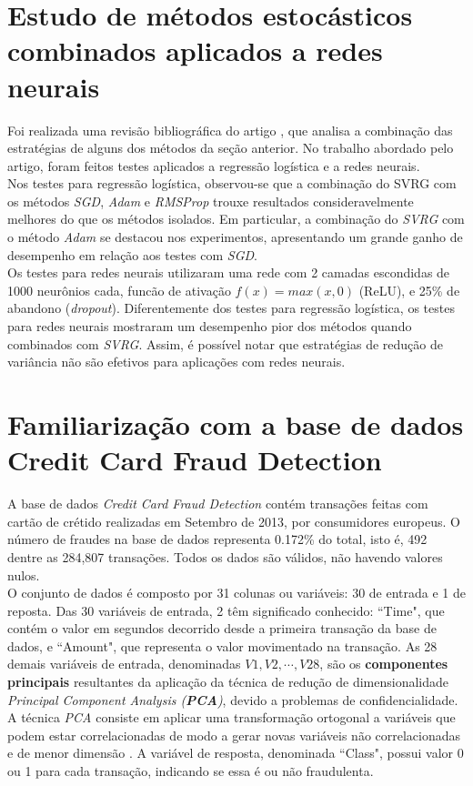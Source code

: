 \documentclass[a4paper,12pt]{article}
\begin{document}
\section{Estudo de métodos estocásticos combinados aplicados a redes neurais}

	Foi realizada uma revisão bibliográfica do artigo \cite{TCCLF}, que analisa a combinação das estratégias de alguns dos métodos da seção anterior. No trabalho abordado pelo artigo, foram feitos testes aplicados a regressão logística e a redes neurais.\\

Nos testes para regressão logística, observou-se que a combinação do SVRG com os métodos \textit{SGD}, \textit{Adam} e \textit{RMSProp} trouxe resultados consideravelmente melhores do que os métodos isolados. Em particular, a combinação do \textit{SVRG} com o método \textit{Adam} se destacou nos experimentos, apresentando um grande ganho de desempenho em relação aos testes com \textit{SGD}.\\

Os testes para redes neurais utilizaram uma rede com 2 camadas escondidas de 1000 neurônios cada, funcão de ativação $f(x) = max(x,0)$ (ReLU), e 25\% de abandono (\textit{dropout}). Diferentemente dos testes para regressão logística, os testes para redes neurais mostraram um desempenho pior dos métodos quando combinados com \textit{SVRG}. Assim, é possível notar que estratégias de redução de variância não são efetivos para aplicações com redes neurais.


\section{Familiarização com a base de dados Credit Card Fraud Detection}
A base de dados \textit{Credit Card Fraud Detection} contém transações feitas com cartão de crétido realizadas em Setembro de 2013, por consumidores europeus. O número de fraudes na base de dados representa 0.172\% do total, isto é, 492 dentre as 284,807 transações. Todos os dados são válidos, não havendo valores nulos.\\


O conjunto de dados é composto por 31 colunas ou variáveis: 30 de entrada e 1 de reposta. Das 30 variáveis de entrada, 2 têm significado conhecido: ``Time", que contém o valor em segundos decorrido desde a primeira transação da base de dados, e ``Amount", que representa o valor movimentado na transação. As 28 demais variáveis de entrada, denominadas $V1, V2,\cdots, V28$, são os \textbf{componentes principais} resultantes da aplicação da técnica de redução de dimensionalidade \textit{Principal Component Analysis (\textbf{PCA})}, devido a problemas de confidencialidade. A técnica \textit{PCA} consiste em aplicar uma transformação ortogonal a variáveis que podem estar correlacionadas de modo a gerar novas variáveis não correlacionadas e de menor dimensão \cite{livroGoodFellow}. A variável de resposta, denominada ``Class", possui valor 0 ou 1 para cada transação, indicando se essa é ou não fraudulenta.\\
\end{document}
